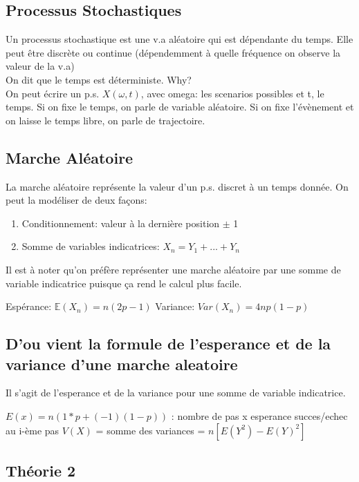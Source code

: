 \documentclass{article}
\begin{document}
\subsection{Processus Stochastiques}

Un processus stochastique est une v.a aléatoire qui est dépendante du temps.
Elle peut être discrète ou continue (dépendemment à quelle fréquence on
observe la valeur de la v.a)\\

On dit que le temps est déterministe. Why?\\

On peut écrire un p.s. $X( \omega, t )$, avec omega: les scenarios
possibles et t, le temps. Si on fixe le temps, on parle de variable
aléatoire. Si on fixe l'évènement et on laisse le temps libre, on
parle de trajectoire.

\subsection{Marche Aléatoire}

La marche aléatoire représente la valeur d'un p.s. discret à un temps donnée.
On peut la modéliser de deux façons:
\begin{enumerate}
    \item Conditionnement: valeur à la dernière position $\pm$ 1
    \item Somme de variables indicatrices: $X_n = Y_1 + ... +Y_n$
\end{enumerate}

Il est à noter qu'on préfère représenter une marche aléatoire par une
somme de variable indicatrice puisque ça rend le calcul plus facile.

Espérance: $\mathbb{E} (X_n) = n (2p-1)$
Variance: $ Var(X_n)= 4np(1-p)$

\subsection{D'ou vient la formule de l'esperance et de la variance d'une
marche aleatoire}

Il s'agit de l'esperance et de la variance pour une somme de variable
indicatrice.

$E(x) = n(1 * p + (-1) (1-p))$ : nombre de pas x esperance succes/echec au
i-ème pas
$V(X)$ = somme des variances = $ n [ E(Y^2) - E(Y)^2 ]$

\subsection{Théorie 2}
\end{document}
